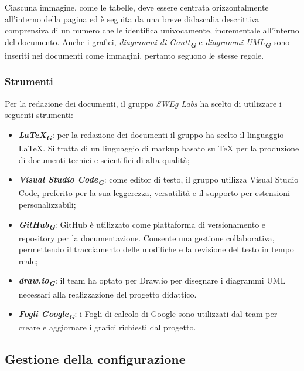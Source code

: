 Ciascuna immagine, come le tabelle, deve essere centrata orizzontalmente all’interno della
pagina ed è seguita da una breve didascalia descrittiva comprensiva di un numero che le
identifica univocamente, incrementale all’interno del documento. Anche i grafici, 
\emph{diagrammi di Gantt}\textsubscript{\textit{\textbf{G}}} e \emph{diagrammi UML}\textsubscript{\textit{\textbf{G}}} 
sono inseriti nei documenti come immagini, pertanto seguono le stesse regole.


\subsubsection{Strumenti}
Per la redazione dei documenti, il gruppo \emph{SWEg Labs} ha scelto di utilizzare i seguenti strumenti:
\begin{itemize}
    \item \textbf{\emph{\LaTeX}}\textsubscript{\textit{\textbf{G}}}: per la redazione dei documenti il gruppo ha scelto il linguaggio \LaTeX. Si tratta
    di un linguaggio di markup basato su TeX per la produzione di documenti tecnici e scientifici di alta qualità;
    \item \textbf{\emph{Visual Studio Code}}\textsubscript{\textit{\textbf{G}}}: come editor di testo, il gruppo utilizza Visual Studio Code, 
    preferito per la sua leggerezza, versatilità e il supporto per estensioni personalizzabili;
    \item \textbf{\emph{GitHub}}\textsubscript{\textit{\textbf{G}}}: GitHub è utilizzato come piattaforma di versionamento e repository per la documentazione. 
    Consente una gestione collaborativa, permettendo il tracciamento delle modifiche e la revisione del testo in tempo reale;
    \item \textbf{\emph{draw.io}}\textsubscript{\textit{\textbf{G}}}: il team ha optato per Draw.io per disegnare i diagrammi UML necessari
    alla realizzazione del progetto didattico.
    \item \textbf{\emph{Fogli Google}}\textsubscript{\textit{\textbf{G}}}: i Fogli di calcolo di Google sono utilizzati dal team per creare e 
    aggiornare i grafici richiesti dal progetto.
\end{itemize}




\subsection{Gestione della configurazione}
\label{sec:gestione_configurazione}

